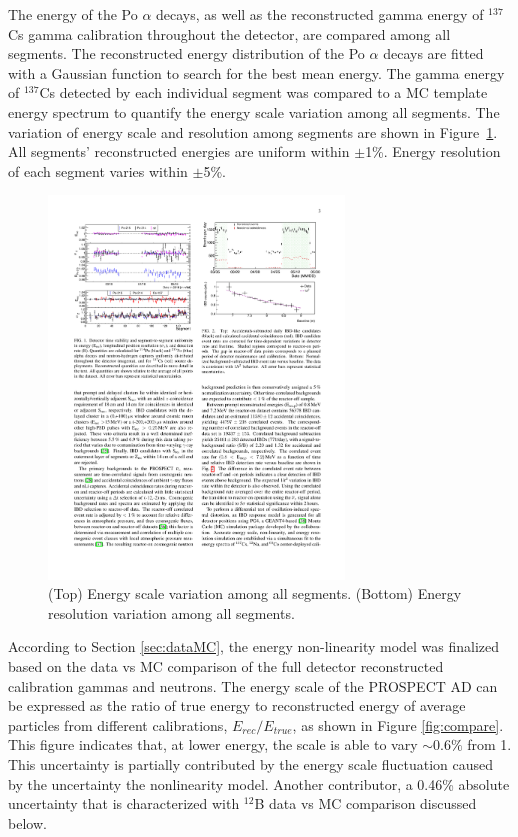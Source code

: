 The energy of the Po $\alpha$ decays, as well as the reconstructed gamma energy of $^{137}$Cs gamma calibration throughout the detector, are compared among all segments.
The reconstructed energy distribution of the Po $\alpha$ decays are fitted with a Gaussian function to search for the best mean energy.
The gamma energy of $^{137}$Cs detected by each individual segment was compared to a MC template energy spectrum to quantify the energy scale variation among all segments.
The variation of energy scale and resolution among segments are shown in Figure~\ref{fig:EvsSegment}.
All segments' reconstructed energies are uniform within $\pm$1\%.
Energy resolution of each segment varies within $\pm$5\%.
\begin{figure}[h!]
\centering
\includegraphics[width=0.7\textwidth]{Figures/EvsSegment.pdf}
\caption[Energy scale variation among segments]{
(Top) Energy scale variation among all segments.
(Bottom) Energy resolution variation among all segments.}
\label{fig:EvsSegment}
\end{figure}

\label{sec:escalefinal}

According to Section \ref{sec:dataMC}, the energy non-linearity model was finalized based on the  data vs MC comparison of the full detector reconstructed calibration gammas and neutrons.
The energy scale of the PROSPECT AD can be expressed as the ratio of true energy to reconstructed energy of average particles from different calibrations, $E_{rec}/E_{true}$, as shown in Figure \ref{fig:compare}.
This figure indicates that, at lower energy, the scale is able to vary $\sim0.6\%$ from 1.
This uncertainty is partially contributed by the energy scale fluctuation caused by the uncertainty the nonlinearity model.  Another contributor, a 0.46\% absolute uncertainty that is characterized with $^{12}$B data vs MC comparison discussed below.

